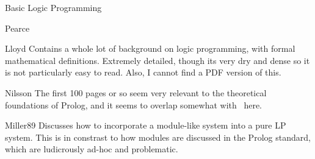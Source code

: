 \begin{pgroup}{Basic Logic Programming}
  \begin{paper}{Pearce}
    \mustread
  \end{paper}

  \begin{paper}{Lloyd}
    Contains a whole lot of background on logic programming, with formal mathematical definitions.
    Extremely detailed, though its very dry and dense so it is not particularly easy to read.
    Also, I cannot find a PDF version of this.

    \mustread
  \end{paper}

  \begin{paper}{Nilsson}
    The first 100 pages or so seem very relevant to the theoretical foundations of Prolog, and it seems to overlap somewhat with~\cite{Lloyd} here.

    \mustread
  \end{paper}

  \begin{paper}{Miller89}
    Discusses how to incorporate a module-like system into a pure LP system.
    This is in constrast to how modules are discussed in the Prolog standard, which are ludicrously ad-hoc and problematic.
    \mustread
  \end{paper}
\end{pgroup}

